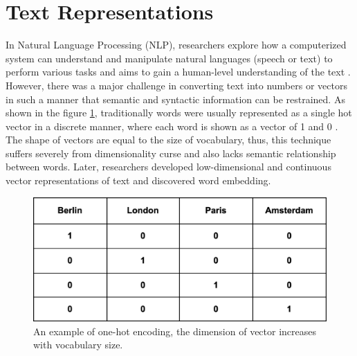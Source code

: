 \documentclass[%
	BCOR=8mm, %
	DIV=12,
	toc=bibliography, %
	toc=listof, %
	oneside, %
	egregdoesnotlikesansseriftitles, %
	]{scrbook}
\begin{document}
\section{Text Representations}
\label{section: textrep}
In Natural Language Processing (NLP), researchers explore how a computerized system can understand and manipulate natural languages (speech or text) to perform various tasks \cite{chowdhury_natural_2003} and aims to gain a human-level understanding of the text \cite{naseem_comprehensive_2020}. However, there was a major challenge in converting text into numbers or vectors in such a manner that semantic and syntactic information can be restrained. As shown in the figure \ref{fig:onehot}, traditionally words were usually represented as a single hot vector in a discrete manner, where each word is shown as a vector of 1 and 0 \cite{salton_vector_1975}. The shape of vectors are equal to the size of vocabulary, thus, this technique suffers severely from dimensionality curse and also lacks semantic relationship between words. Later, researchers developed low-dimensional and continuous vector representations of text and discovered word embedding.
\begin{figure}[h!]
    \centering
    \includegraphics[width=0.5\linewidth]{img/onehot.png}
    \caption[Example of one-hot encoding.]{ An example of one-hot encoding, the dimension of vector increases with vocabulary size.}
    \label{fig:onehot}
\end{figure}
\end{document}
